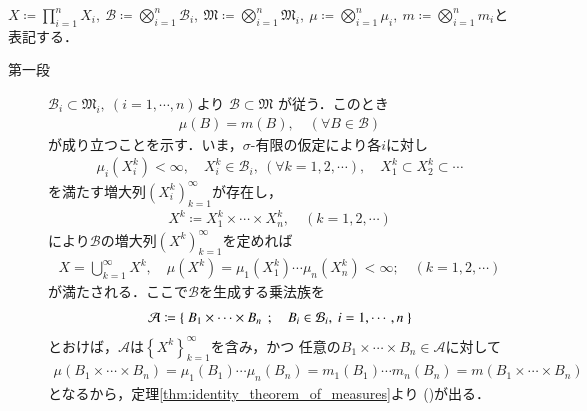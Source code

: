 		\begin{prf} $X \coloneqq \prod_{i=1}^n X_i,\ 
			\mathcal{B} \coloneqq \bigotimes_{i=1}^n \mathcal{B}_i,\ 
			\mathfrak{M} \coloneqq \bigotimes_{i=1}^n \mathfrak{M}_i,\ 
			\mu \coloneqq \bigotimes_{i=1}^n \mu_i,\ 
			m \coloneqq  \bigotimes_{i=1}^n m_i$と表記する．
			\begin{description}
				\item[第一段]
					$\mathcal{B}_i \subset \mathfrak{M}_i,\ (i=1,\cdots,n)$より
					$\mathcal{B} \subset \mathfrak{M}$
					が従う．このとき
					\begin{align}
						\mu(B) 
						= m(B),
						\quad (\forall B \in \mathcal{B})
						\label{eq:thm_product_space_of_complete_measure_space_1}
					\end{align}
					が成り立つことを示す．いま，$\sigma$-有限の仮定により各$i$に対し
					\begin{align}
						\mu_i(X^k_i) < \infty,
						\quad X^k_i \in \mathcal{B}_i,
						\ (\forall k = 1,2,\cdots),
						\quad X^k_1 \subset X^k_2 \subset \cdots
					\end{align}
					を満たす増大列$\left( X^k_i \right)_{k=1}^\infty$が存在し，
					\begin{align}
						X^k \coloneqq X^k_1 \times \cdots \times X^k_n,
						\quad (k=1,2,\cdots)
					\end{align}
					により$\mathcal{B}$の増大列$(X^k)_{k=1}^\infty$を定めれば
					\begin{align}
						X = \bigcup_{k=1}^\infty X^k,
						\quad \mu(X^k)
						= \mu_1(X^k_1) \cdots \mu_n(X^k_n) < \infty;
						\quad (k=1,2,\cdots)
					\end{align}
					が満たされる．ここで$\mathcal{B}$を生成する乗法族を
					\begin{align}
						\mathcal{A} \coloneqq
						\left\{\ B_1 \times \cdots \times B_n\ \, ; \quad B_i \in \mathcal{B}_i,\ i=1,\cdots,n\ \right\}
					\end{align}
					とおけば，$\mathcal{A}$は$\left\{ X^k \right\}_{k=1}^\infty$を含み，かつ
					任意の$B_1 \times \cdots \times B_n \in \mathcal{A}$に対して
					\begin{align}
						\mu(B_1 \times \cdots \times B_n)
						= \mu_1(B_1) \cdots \mu_n(B_n)
						= m_1(B_1) \cdots m_n(B_n)
						= m(B_1 \times \cdots \times B_n)
					\end{align}
					となるから，定理\ref{thm:identity_theorem_of_measures}より
					()が出る．
					

\end{description}
\end{prf}
